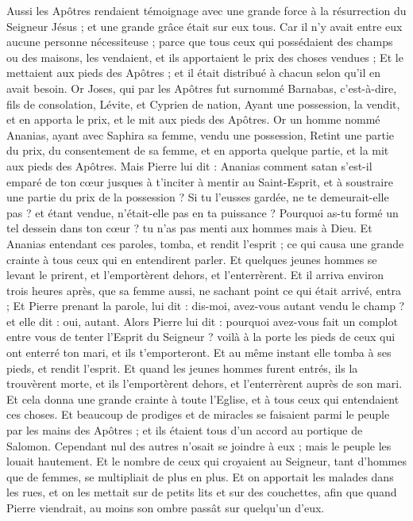 \begin{multicols}{2}
Aussi les Apôtres rendaient témoignage avec une grande force à la résurrection du Seigneur Jésus ; et une grande grâce était sur eux tous.
Car il n'y avait entre eux aucune personne nécessiteuse ; parce que tous ceux qui possédaient des champs ou des maisons, les vendaient, et ils apportaient le prix des choses vendues ;
Et le mettaient aux pieds des Apôtres ; et il était distribué à chacun selon qu'il en avait besoin.
Or Joses, qui par les Apôtres fut surnommé Barnabas, c'est-à-dire, fils de consolation, Lévite, et Cyprien de nation,
Ayant une possession, la vendit, et en apporta le prix, et le mit aux pieds des Apôtres.
\VerseOne{}Or un homme nommé Ananias, ayant avec Saphira sa femme, vendu une possession,
Retint une partie du prix, du consentement de sa femme, et en apporta quelque partie, et la mit aux pieds des Apôtres.
Mais Pierre lui dit : Ananias comment satan s'est-il emparé de ton cœur jusques à t'inciter à mentir au Saint-Esprit, et à soustraire une partie du prix de la possession ?
Si tu l'eusses gardée, ne te demeurait-elle pas ? et étant vendue, n'était-elle pas en ta puissance ? Pourquoi as-tu formé un tel dessein dans ton cœur ? tu n'as pas menti aux hommes mais à Dieu.
Et Ananias entendant ces paroles, tomba, et rendit l'esprit ; ce qui causa une grande crainte à tous ceux qui en entendirent parler.
Et quelques jeunes hommes se levant le prirent, et l'emportèrent dehors, et l'enterrèrent.
Et il arriva environ trois heures après, que sa femme aussi, ne sachant point ce qui était arrivé, entra ;
Et Pierre prenant la parole, lui dit : dis-moi, avez-vous autant vendu le champ ? et elle dit : oui, autant.
Alors Pierre lui dit : pourquoi avez-vous fait un complot entre vous de tenter l'Esprit du Seigneur ? voilà à la porte les pieds de ceux qui ont enterré ton mari, et ils t'emporteront.
Et au même instant elle tomba à ses pieds, et rendit l'esprit. Et quand les jeunes hommes furent entrés, ils la trouvèrent morte, et ils l'emportèrent dehors, et l'enterrèrent auprès de son mari.
Et cela donna une grande crainte à toute l'Eglise, et à tous ceux qui entendaient ces choses.
Et beaucoup de prodiges et de miracles se faisaient parmi le peuple par les mains des Apôtres ; et ils étaient tous d'un accord au portique de Salomon.
Cependant nul des autres n'osait se joindre à eux ; mais le peuple les louait hautement.
Et le nombre de ceux qui croyaient au Seigneur, tant d'hommes que de femmes, se multipliait de plus en plus.
Et on apportait les malades dans les rues, et on les mettait sur de petits lits et sur des couchettes, afin que quand Pierre viendrait, au moins son ombre passât sur quelqu'un d'eux.

\end{multicols}

